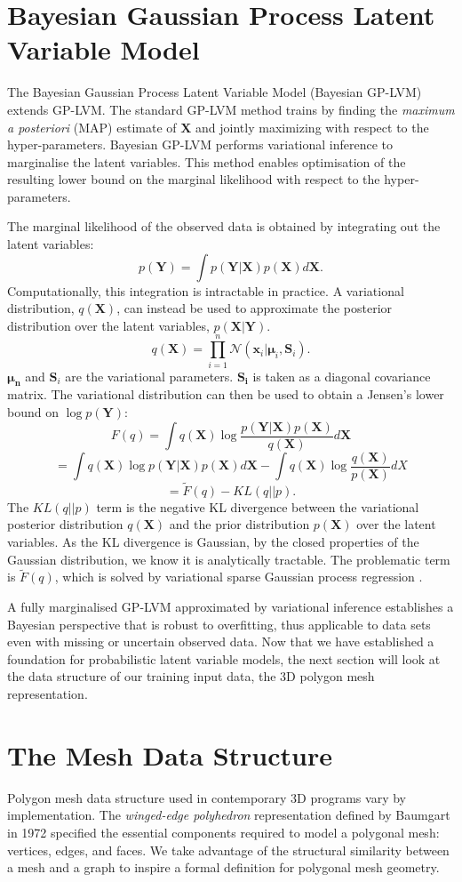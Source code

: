 \documentclass[ %
author={Dillon Keith Diep},
supervisor={Dr. Carl Henrik Ek},
degree={MEng},
title={ART-CG:},
subtitle={Assisted Real-time Content Generation of 3D Hair by Learning Manifolds},
type={Research},
year={2017} ]{dissertation}
\begin{document}
\section{Bayesian Gaussian Process Latent Variable Model}
The Bayesian Gaussian Process Latent Variable Model (Bayesian GP-LVM) \cite{bgplvm} extends GP-LVM. The standard GP-LVM method trains by finding the \textit{maximum a posteriori} (MAP) estimate of $\bm{X}$ and jointly maximizing with respect to the hyper-parameters. Bayesian GP-LVM performs variational inference to marginalise the latent variables. This method enables optimisation of the resulting lower bound on the marginal likelihood with respect to the hyper-parameters. 

The marginal likelihood of the observed data is obtained by integrating out the latent variables:
$$p(\bm{Y})=\int p(\bm{Y|X})p(\bm{X})d\bm{X}.$$
Computationally, this integration is intractable in practice. A variational distribution, $q(\bm{X})$, can instead be used to approximate the posterior distribution over the latent variables, $p(\bm{X|Y})$.
$$q(\bm{X})=\prod^n_{i=1}\mathcal{N}(\bm{x}_i|\bm{\mu}_i,\bm{S}_i).$$
$\bm{\mu_n}$ and $\bm{S}_i$ are the variational parameters. $\bm{S_i}$ is taken as a diagonal covariance matrix. 
The variational distribution can then be used to obtain a Jensen's lower bound on $\log p(\bm{Y})$:
$$F(q)=\int q(\bm{X})\log \frac{ p(\bm{Y|X})p(\bm{X}) }{ q(\bm{X}) } d\bm{X}$$
$$=\int q(\bm{X})\log p(\bm{Y|X})p(\bm{X})d\bm{X} - \int q(\bm{X})\log\frac{q(\bm{X})}{p(\bm{X})}dX$$
$$=\tilde{F}(q)-KL(q||p).$$
The $KL(q||p)$ term is the negative KL divergence between the variational posterior distribution $q(\bm{X})$ and the prior distribution $p(\bm{X})$ over the latent variables. As the KL divergence is Gaussian, by the closed properties of the Gaussian distribution, we know it is analytically tractable. The problematic term is $\tilde{F}(q)$, which is solved by variational sparse Gaussian process regression \cite{bgplvm}.

A fully marginalised GP-LVM approximated by variational inference establishes a Bayesian perspective that is robust to overfitting, thus applicable to data sets even with missing or uncertain observed data. Now that we have established a foundation for probabilistic latent variable models, the next section will look at the data structure of our training input data, the 3D polygon mesh representation.

\section{The Mesh Data Structure}
Polygon mesh data structure used in contemporary 3D programs vary by implementation. The \textit{winged-edge polyhedron} representation defined by Baumgart in 1972 \cite{wingededge} specified the essential components required to model a polygonal mesh: vertices, edges, and faces. We take advantage of the structural similarity between a mesh and a graph to inspire a formal definition for polygonal mesh geometry.
\end{document}
